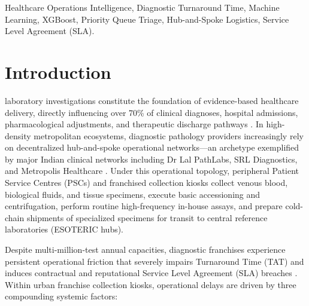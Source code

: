 \documentclass[conference]{IEEEtran}
\begin{document}
\begin{IEEEkeywords}
Healthcare Operations Intelligence, Diagnostic Turnaround Time, Machine Learning, XGBoost, Priority Queue Triage, Hub-and-Spoke Logistics, Service Level Agreement (SLA).
\end{IEEEkeywords}

\section{Introduction}
 laboratory investigations constitute the foundation of evidence-based healthcare delivery, directly influencing over 70\% of clinical diagnoses, hospital admissions, pharmacological adjustments, and therapeutic discharge pathways \cite{hawkins2007laboratory,valenstein1996turnaround}. In high-density metropolitan ecosystems, diagnostic pathology providers increasingly rely on decentralized hub-and-spoke operational networks—an archetype exemplified by major Indian clinical networks including Dr Lal PathLabs, SRL Diagnostics, and Metropolis Healthcare \cite{lalpathlabs2023operational}. Under this operational topology, peripheral Patient Service Centres (PSCs) and franchised collection kiosks collect venous blood, biological fluids, and tissue specimens, execute basic accessioning and centrifugation, perform routine high-frequency in-house assays, and prepare cold-chain shipments of specialized specimens for transit to central reference laboratories (ESOTERIC hubs).

Despite multi-million-test annual capacities, diagnostic franchises experience persistent operational friction that severely impairs Turnaround Time (TAT) and induces contractual and reputational Service Level Agreement (SLA) breaches \cite{stotler2002improving,howanitz2002laboratory}. Within urban franchise collection kiosks, operational delays are driven by three compounding systemic factors:
\end{document}

